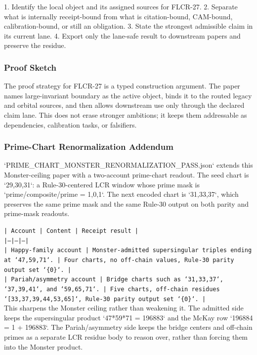 \documentclass[11pt]{article}
\begin{document}
1. Identify the local object and its assigned sources for FLCR-27.
2. Separate what is internally receipt-bound from what is citation-bound, CAM-bound, calibration-bound, or still an obligation.
3. State the strongest admissible claim in its current lane.
4. Export only the lane-safe result to downstream papers and preserve the residue.

\subsubsection*{Proof Sketch}

The proof strategy for FLCR-27 is a typed construction argument. The paper names large-invariant boundary as the active object, binds it to the routed legacy and orbital sources, and then allows downstream use only through the declared claim lane. This does not erase stronger ambitions; it keeps them addressable as dependencies, calibration tasks, or falsifiers.

\subsubsection*{Prime-Chart Renormalization Addendum}

`PRIME\_CHART\_MONSTER\_RENORMALIZATION\_PASS.json` extends this Monster-ceiling
paper with a two-account prime-chart readout. The seed chart is `29,30,31`: a
Rule-30-centered LCR window whose prime mask is
`prime/composite/prime = 1,0,1`. The next encoded chart is `31,33,37`, which
preserves the same prime mask and the same Rule-30 output on both parity and
prime-mask readouts.

\noindent\texttt{| Account | Content | Receipt result |}\\
\noindent\texttt{|---|---|---|}\\
\noindent\texttt{| Happy-family account | Monster-admitted supersingular triples ending at `47,59,71`. | Four charts, no off-chain values, Rule-30 parity output set `\{0\}`. |}\\
\noindent\texttt{| Pariah/asymmetry account | Bridge charts such as `31,33,37`, `37,39,41`, and `59,65,71`. | Five charts, off-chain residues `[33,37,39,44,53,65]`, Rule-30 parity output set `\{0\}`. |}\\

This sharpens the Monster ceiling rather than weakening it. The admitted side
keeps the supersingular product `47*59*71 = 196883` and the McKay row
`196884 = 1 + 196883`. The Pariah/asymmetry side keeps the bridge centers and
off-chain primes as a separate LCR residue body to reason over, rather than
forcing them into the Monster product.
\end{document}
